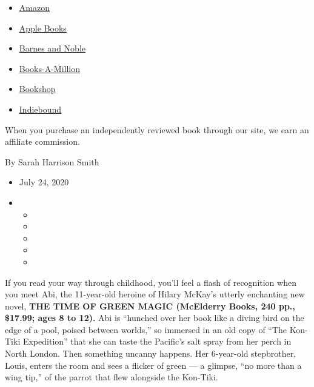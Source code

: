 \begin{itemize}
\tightlist
\item
  \href{https://www.amazon.com/gp/search?index=books\&tag=NYTBSREV-20\&field-keywords=The+Time+of+Green+Magic+Hilary+McKay}{Amazon}
\item
  \href{https://du-gae-books-dot-nyt-du-prd.appspot.com/buy?title=The+Time+of+Green+Magic\&author=Hilary+McKay}{Apple
  Books}
\item
  \href{https://www.anrdoezrs.net/click-7990613-11819508?url=https\%3A\%2F\%2Fwww.barnesandnoble.com\%2Fw\%2F\%3Fean\%3D9781534462762}{Barnes
  and Noble}
\item
  \href{https://www.anrdoezrs.net/click-7990613-35140?url=https\%3A\%2F\%2Fwww.booksamillion.com\%2Fp\%2FThe\%2BTime\%2Bof\%2BGreen\%2BMagic\%2FHilary\%2BMcKay\%2F9781534462762}{Books-A-Million}
\item
  \href{https://bookshop.org/a/3546/9781534462762}{Bookshop}
\item
  \href{https://www.indiebound.org/book/9781534462762?aff=NYT}{Indiebound}
\end{itemize}

When you purchase an independently reviewed book through our site, we
earn an affiliate commission.

By Sarah Harrison Smith

\begin{itemize}
\item
  July 24, 2020
\item
  \begin{itemize}
  \item
  \item
  \item
  \item
  \item
  \end{itemize}
\end{itemize}

If you read your way through childhood, you'll feel a flash of
recognition when you meet Abi, the 11-year-old heroine of Hilary McKay's
utterly enchanting new novel, \textbf{THE TIME OF GREEN MAGIC (McElderry
Books, 240 pp., \$17.99; ages 8 to 12).} Abi is ``hunched over her book
like a diving bird on the edge of a pool, poised between worlds,'' so
immersed in an old copy of ``The Kon-Tiki Expedition'' that she can
taste the Pacific's salt spray from her perch in North London. Then
something uncanny happens. Her 6-year-old stepbrother, Louis, enters the
room and sees a flicker of green --- a glimpse, ``no more than a wing
tip,'' of the parrot that flew alongside the Kon-Tiki.

